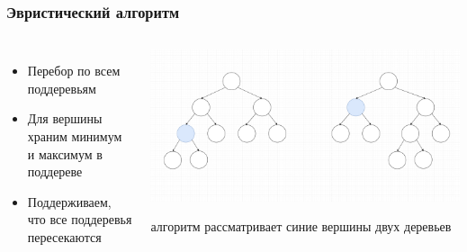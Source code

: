 \documentclass{beamer}
\begin{document}
\begin{frame} \frametitle{Эвристический алгоритм}
    \begin{columns}
            \begin{itemize}
                \item Перебор по всем поддеревьям
                \item Для вершины храним минимум и максимум в поддереве
                \item Поддерживаем, что все поддеревья пересекаются
            \end{itemize}
            \begin{center}
            \includegraphics[height=0.8\textheight]{tree.png}

            алгоритм рассматривает синие вершины двух деревьев
            \end{center}
    \end{columns}
\end{frame}
\end{document}
